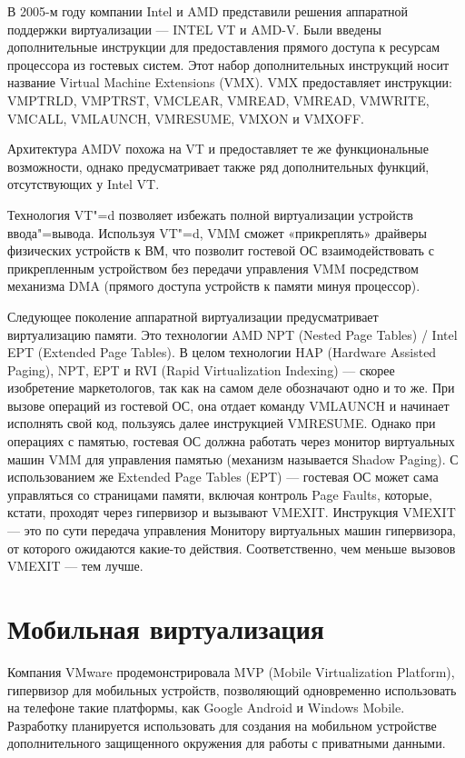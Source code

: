 \documentclass[10pt, a5paper]{article}
\begin{document}
В 2005-м году компании Intel и AMD представили решения аппаратной  поддержки виртуализации --- INTEL VT и AMD-V. Были введены дополнительные инструкции для предоставления прямого доступа к ресурсам процессора из гостевых систем. Этот набор дополнительных инструкций носит название Virtual Machine Extensions (VMX). VMX предоставляет инструкции: VMPTRLD, VMPTRST, VMCLEAR, VMREAD, VMREAD, VMWRITE, \linebreak VMCALL, VMLAUNCH, VMRESUME, VMXON и VMXOFF.

Архитектура AMDV похожа на VT и предоставляет те же функциональные возможности, однако предусматривает также ряд дополнительных функций, отсутствующих у Intel VT.

Технология VT"=d позволяет избежать полной виртуализации \linebreak устройств ввода"=вывода. Используя VT"=d, VMM сможет «прикреплять» драйверы физических устройств к ВМ, что позволит гостевой ОС взаимодействовать с прикрепленным устройством без передачи управления VMM посредством механизма DMA (прямого доступа устройств к памяти минуя процессор).

Следующее поколение аппаратной виртуализации предусматривает виртуализацию памяти. Это технологии AMD NPT (Nested Page Tables) / Intel EPT (Extended Page Tables). В целом технологии HAP (Hardware Assisted Paging), NPT, EPT и RVI (Rapid Virtualization Indexing) --- скорее изобретение маркетологов, так как на самом деле обозначают одно и то же. При  вызове операций из гостевой ОС, она отдает команду VMLAUNCH и начинает исполнять свой код, пользуясь далее инструкцией VMRESUME. Однако при операциях с памятью, гостевая ОС должна работать через монитор виртуальных машин VMM для управления памятью (механизм называется Shadow Paging). С использованием же Extended Page Tables (EPT) --- гостевая ОС может сама управляться со страницами памяти, включая контроль Page Faults, которые, кстати, проходят через гипервизор и вызывают VMEXIT. Инструкция VMEXIT --- это по сути передача управления Монитору виртуальных машин гипервизора, от которого ожидаются какие-то действия. Соответственно, чем меньше вызовов VMEXIT --- тем лучше.

\section*{Мобильная виртуализация}

Компания VMware продемонстрировала MVP (Mobile \linebreak Virtualization Platform), гипервизор для мобильных устройств, позволяющий одновременно использовать на телефоне такие платформы, как Google Android и Windows Mobile. Разработку планируется использовать для создания на мобильном устройстве дополнительного защищенного окружения для работы с приватными данными. 
\end{document}
